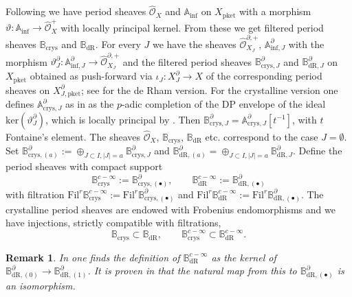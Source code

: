 \documentclass[asterisque,english]{smfart}
\newtheorem{remark}[theo]{Remark}
\begin{document}
Following \cite[\S 2.2]{DLLZb} we have period sheaves $\widehat{\mathcal{O}}_X$ and $\mathbb{A}_{\mathrm{inf}}$ on $X_{\mathrm{pket}}$ with a morphism  $\vartheta\colon \mathbb{A}_{\mathrm{inf}} \to \widehat{\mathcal{O}}_X^+$ with locally principal kernel. From these we get filtered period sheaves $\mathbb{B}_{\mathrm{crys}}$ and $\mathbb{B}_{\mathrm{dR}}$. For every $J$ we have the sheaves $\widehat{\mathcal{O}}_{X_J}^{\partial,+}$, $\mathbb{A}_{\mathrm{inf},J}^\partial$ with the morphism $\vartheta_J^\partial\colon \mathbb{A}_{\mathrm{inf},J}^\partial \to \widehat{\mathcal{O}}_{X_J}^{\partial,+}$ 
and the filtered period sheaves $\mathbb{B}_{\mathrm{crys},J}^\partial$ and $\mathbb{B}_{\mathrm{dR},J}^\partial$ on $X_{\mathrm{pket}}$  obtained as push-forward via $\iota_J\colon X_J^\partial\to X$ of the corresponding period sheaves on $X^\partial_{J,\mathrm{pket}}$; see \cite[Def. 2.5.2]{LLZ} for the de Rham version. For the crystalline version one defines $\mathbb{A}_{\mathrm{crys},J}^\partial$ as in \cite[Def. 2.1]{TT} as the $p$-adic completion of the DP 
envelope of the ideal $\mathrm{ker}(\vartheta_J^\partial)$, which is locally principal by \cite[Cor. 2.5.3]{LLZ}. Then $\mathbb{B}_{\mathrm{crys},J}^\partial= \mathbb{A}_{\mathrm{crys},J}^\partial[t^{-1}]$, with $t$ Fontaine's element. 
The sheaves $\widehat{\mathcal{O}}_X$, $\mathbb{B}_{\mathrm{crys}}$, $\mathbb{B}_{\mathrm{dR}}$ etc. correspond to the case $J=\emptyset$. Set $\mathbb{B}_{\mathrm{crys},(a)}^\partial:=\oplus_{J\subset I, \vert J\vert=a} \mathbb{B}_{\mathrm{crys},J}^\partial$ and $\mathbb{B}_{\mathrm{dR},(a)}^\partial=\oplus_{J\subset I, \vert J\vert=a} \mathbb{B}_{\mathrm{dR},J}^\partial$. Define the  period sheaves with compact support
$$\mathbb{B}_{\mathrm{crys}}^{c-\infty}:=\mathbb{B}_{\mathrm{crys},(\bullet)}^\partial, \qquad 
\mathbb{B}_{\mathrm{dR}}^{c-\infty}:=\mathbb{B}_{\mathrm{dR},(\bullet)}^\partial $$with filtration $\mathrm{Fil}^r \mathbb{B}_{\mathrm{crys}}^{c-\infty}:=\mathrm{Fil}^r\mathbb{B}_{\mathrm{crys},(\bullet)}^\partial$ and $\mathrm{Fil}^r \mathbb{B}_{\mathrm{dR}}^{c-\infty}:=\mathrm{Fil}^r\mathbb{B}_{\mathrm{dR},(\bullet)}^\partial$.  The crystalline period sheaves are endowed with Frobenius endomorphisms and we have injections, strictly compatible with filtrations,  $$\mathbb{B}_{\mathrm{crys}}\subset \mathbb{B}_{\mathrm{dR}}, \qquad \mathbb{B}_{\mathrm{crys}}^{c-\infty}\subset \mathbb{B}_{\mathrm{dR}}^{c-\infty}.$$
\begin{remark} In \cite[Def.~3.3.2]{LLZ} one finds the definition of $\mathbb{B}_{\mathrm{dR}}^{c-\infty}$ as the kernel of $\mathbb{B}_{\mathrm{dR},(0)}^\partial \to \mathbb{B}_{\mathrm{dR},(1)}^\partial$. It is proven in 
\cite[Lemma 3.3.7]{LLZ} that the natural map from this to $\mathbb{B}_{\mathrm{dR},(\bullet)}^\partial$ is an isomorphism. 
\end{remark}
\end{document}
